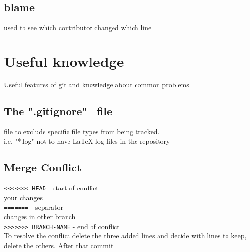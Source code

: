 \subsection*{blame}
used to see which contributor changed which line \\


\section*{Useful knowledge}
Useful features of git and knowledge about common problems
\subsection*{The ".gitignore" \ file}
file to exclude specific file types from being tracked.\\
i.e. "*.log" not to have LaTeX log files in the repository\\

\subsection*{Merge Conflict}
\texttt{<{}<{}<{}<{}<{}<{}< HEAD} - start of conflict\\
your changes\\
\texttt{=======} - separator \\
changes in other branch \\
\texttt{>{}>{}>{}>{}>{}>{}> BRANCH-NAME} - end of conflict\\
To resolve the conflict delete the three added lines and decide with lines to keep, delete the others. After that commit.


